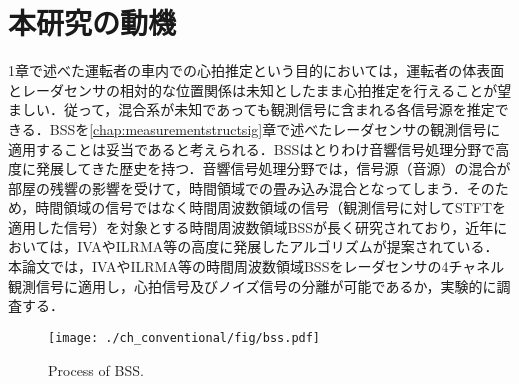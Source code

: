 \section{本研究の動機}
\label{sec:conv:researchmotivation}
{1章で述べた運転者の車内での心拍推定という目的においては，運転者の体表面とレーダセンサの相対的な位置関係は未知としたまま心拍推定を行えることが望ましい．従って，混合系が未知であっても観測信号に含まれる各信号源を推定できる．BSSを\ref{chap:measurementstructsig}章で述べたレーダセンサの観測信号に適用することは妥当であると考えられる．BSSはとりわけ音響信号処理分野で高度に発展してきた歴史を持つ．音響信号処理分野では，信号源（音源）の混合が部屋の残響の影響を受けて，時間領域での畳み込み混合となってしまう．そのため，時間領域の信号ではなく時間周波数領域の信号（観測信号に対してSTFTを適用した信号）を対象とする時間周波数領域BSSが長く研究されており，近年においては，IVAやILRMA等の高度に発展したアルゴリズムが提案されている．本論文では，IVAやILRMA等の時間周波数領域BSSをレーダセンサの4チャネル観測信号に適用し，心拍信号及びノイズ信号の分離が可能であるか，実験的に調査する．}

\begin{figure}[!t]
\centering
\texttt{[image: ./ch\_conventional/fig/bss.pdf]}
\caption{Process of BSS.}
\label{fig:bss}
\end{figure}


